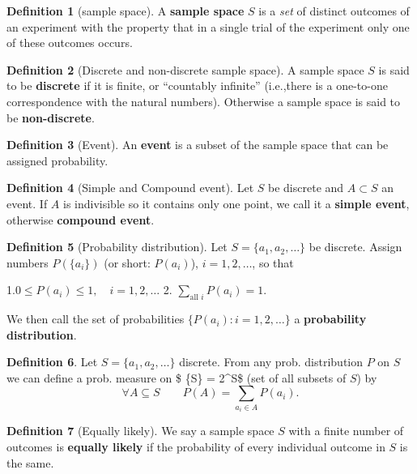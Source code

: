 \documentclass[
]{book}
\theoremstyle{definition}
\newtheorem{definition}{Definition}[chapter]
\theoremstyle{definition}
\theoremstyle{definition}
\theoremstyle{definition}
\theoremstyle{remark}
\begin{document}
\begin{definition}[sample space]
A \textbf{sample space} \(S\) is a \emph{set} of distinct outcomes of an experiment with the property that in a single trial of the experiment only one of these outcomes occurs.
\end{definition}

\begin{definition}[Discrete and non-discrete sample space]
A sample space \(S\) is said to be \textbf{discrete} if it is finite, or ``countably infinite'' (i.e.,there is a one-to-one correspondence with the natural numbers). Otherwise a sample space is said to be \textbf{non-discrete}.
\end{definition}

\begin{definition}[Event]
An \textbf{event} is a subset of the sample space that can be assigned probability.
\end{definition}

\begin{definition}[Simple and Compound event]
Let \(S\) be discrete and \(A\subset S\) an event. If \(A\) is indivisible so it contains only one point, we call it a \textbf{simple event}, otherwise \textbf{compound event}.
\end{definition}

\begin{definition}[Probability distribution]
Let \(S=\{a_1,a_2,\dots\}\) be discrete. Assign numbers \(P(\{a_i\})\) (or short: \(P(a_i)\)), \(i=1,2,\dots\), so that

1.\(0\leq P(a_i)\leq 1,\quad i=1,2,\dots\)
2. \(\sum_{\text{all }i}P(a_i)=1\).

We then call the set of probabilities \(\{P(a_i):i=1,2,\dots\}\) a \textbf{probability distribution}.
\end{definition}

\begin{definition}
Let \(S=\{a_1,a_2,\dots\}\) discrete. From any prob. distribution \(P\) on \(S\) we can define a prob. measure on \$ \{\mathcal S\} = 2\^{}S\$ (set of all subsets of \(S\)) by
\[\forall A \subseteq S \qquad P(A)=\sum_{a_i\in A}P(a_i).\]
\end{definition}

\begin{definition}[Equally likely]
We say a sample space \(S\) with a finite number of outcomes is \textbf{equally likely} if the probability of every individual outcome in \(S\) is the same.
\end{definition}
\end{document}
